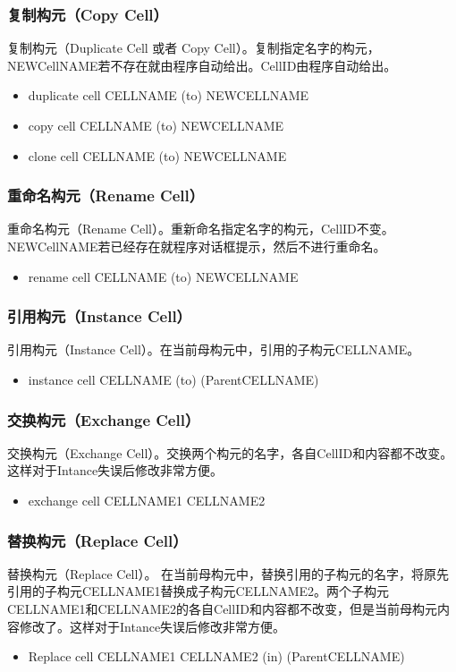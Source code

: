 \subsubsection{复制构元（Copy Cell）} \label{SectCmdCopyCell}
复制构元（Duplicate Cell 或者 Copy Cell）。复制指定名字的构元，NEWCellNAME若不存在就由程序自动给出。CellID由程序自动给出。
\begin{itemize}
	\item duplicate cell CELLNAME (to) NEWCELLNAME 
	\item copy cell CELLNAME (to) NEWCELLNAME
	\item clone cell CELLNAME (to) NEWCELLNAME
\end{itemize}

\subsubsection{重命名构元（Rename Cell）} \label{SectCmdRenameCell}
重命名构元（Rename Cell）。重新命名指定名字的构元，CellID不变。NEWCellNAME若已经存在就程序对话框提示，然后不进行重命名。
\begin{itemize}
	\item rename cell CELLNAME (to) NEWCELLNAME 
\end{itemize}

\subsubsection{引用构元（Instance Cell）} \label{SectCmdCallCell}
引用构元（Instance Cell）。在当前母构元中，引用的子构元CELLNAME。
\begin{itemize}
	\item instance cell CELLNAME (to) (ParentCELLNAME) 
\end{itemize}

\subsubsection{交换构元（Exchange Cell）} \label{SectCmdExchCell}
交换构元（Exchange Cell）。交换两个构元的名字，各自CellID和内容都不改变。这样对于Intance失误后修改非常方便。
\begin{itemize}
	\item exchange cell CELLNAME1 CELLNAME2
\end{itemize}

\subsubsection{替换构元（Replace Cell）} \label{SectCmdReplCell}
替换构元（Replace Cell）。 在当前母构元中，替换引用的子构元的名字，将原先引用的子构元CELLNAME1替换成子构元CELLNAME2。两个子构元CELLNAME1和CELLNAME2的各自CellID和内容都不改变，但是当前母构元内容修改了。这样对于Intance失误后修改非常方便。
\begin{itemize}
	\item Replace cell CELLNAME1 CELLNAME2 (in) (ParentCELLNAME) 
\end{itemize}

